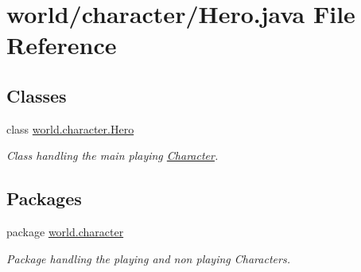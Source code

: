 \hypertarget{a00059}{\section{world/character/\-Hero.java File Reference}
\label{a00059}
}
\subsection*{Classes}
\begin{DoxyCompactItemize}
\item 
class \hyperlink{a00013}{world.\-character.\-Hero}
\begin{DoxyCompactList}\small\item\em Class handling the main playing \hyperlink{a00005}{Character}. \end{DoxyCompactList}\end{DoxyCompactItemize}
\subsection*{Packages}
\begin{DoxyCompactItemize}
\item 
package \hyperlink{a00090}{world.\-character}
\begin{DoxyCompactList}\small\item\em Package handling the playing and non playing Characters. \end{DoxyCompactList}\end{DoxyCompactItemize}
